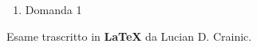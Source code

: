 \documentclass[fleqn]{article}
\begin{document}
\begin{enumerate}
   \item Domanda 1
\end{enumerate}
Esame trascritto in \textbf{\LaTeX} da Lucian D. Crainic.
\end{document}
